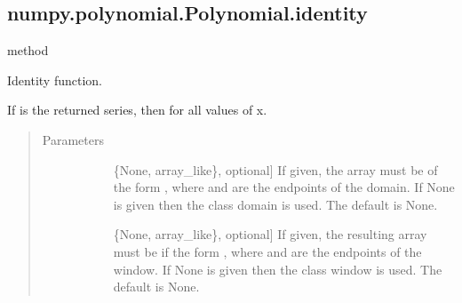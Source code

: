 \documentclass[letterpaper,10pt,english]{sphinxmanual}
\begin{document}
\begin{fulllineitems}
\begin{fulllineitems}
\begin{quote}
\begin{description}
\begin{description}
\end{description}

\end{description}\end{quote}

\end{fulllineitems}



\subsection{numpy.polynomial.Polynomial.identity}
\label{\detokenize{generated/generated/numpy.polynomial.Polynomial.identity:numpy-polynomial-polynomial-identity}}\label{\detokenize{generated/generated/numpy.polynomial.Polynomial.identity::doc}}
method

\begin{fulllineitems}
\label{\detokenize{generated/generated/numpy.polynomial.Polynomial.identity:numpy.polynomial.Polynomial.identity}}
Identity function.

If  is the returned series, then  for all
values of x.
\begin{quote}\begin{description}
\item[{Parameters}] \leavevmode\begin{description}
\item[{}] \leavevmode{[}\{None, array\_like\}, optional{]}
If given, the array must be of the form , where
 and  are the endpoints of the domain. If None is
given then the class domain is used. The default is None.

\item[{}] \leavevmode{[}\{None, array\_like\}, optional{]}
If given, the resulting array must be if the form
, where  and  are the endpoints of
the window. If None is given then the class window is used. The
default is None.


\end{description}
\end{description}
\end{quote}
\end{fulllineitems}
\end{fulllineitems}
\end{document}
